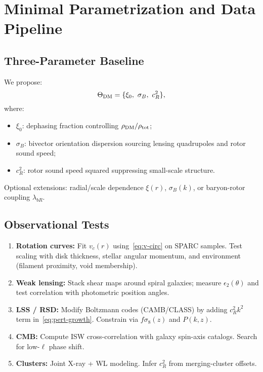 \documentclass[11pt,a4paper]{article}
\numberwithin{equation}{section}
\theoremstyle{plain}
\theoremstyle{definition}
\theoremstyle{remark}
\begin{document}
\vspace{1em}

\section{Minimal Parametrization and Data Pipeline}\label{sec:pipeline}

\subsection{Three-Parameter Baseline}

We propose:
\begin{equation}
\Theta_{\rm DM}=\{\xi_0,\ \sigma_B,\ c_R^2\},
\label{eq:params}
\end{equation}
where:
\begin{itemize}[leftmargin=*]
  \item $\xi_0$: dephasing fraction controlling $\rho_{\rm DM}/\rho_{\rm tot}$;
  \item $\sigma_B$: bivector orientation dispersion sourcing lensing quadrupoles and rotor sound speed;
  \item $c_R^2$: rotor sound speed squared suppressing small-scale structure.
\end{itemize}

Optional extensions: radial/scale dependence $\xi(r)$, $\sigma_B(k)$, or baryon-rotor coupling $\lambda_{bR}$.

\subsection{Observational Tests}

\begin{enumerate}[leftmargin=*]
  \item \textbf{Rotation curves:} Fit $v_c(r)$ using~\eqref{eq:v-circ} on SPARC samples. Test scaling with disk thickness, stellar angular momentum, and environment (filament proximity, void membership).
  \item \textbf{Weak lensing:} Stack shear maps around spiral galaxies; measure $\epsilon_2(\theta)$ and test correlation with photometric position angles.
  \item \textbf{LSS / RSD:} Modify Boltzmann codes (CAMB/CLASS) by adding $c_R^2 k^2$ term in~\eqref{eq:pert-growth}. Constrain via $f\sigma_8(z)$ and $P(k,z)$.
  \item \textbf{CMB:} Compute ISW cross-correlation with galaxy spin-axis catalogs. Search for low-$\ell$ phase shift.
  \item \textbf{Clusters:} Joint X-ray + WL modeling. Infer $c_R^2$ from merging-cluster offsets.
\end{enumerate}
\end{document}

